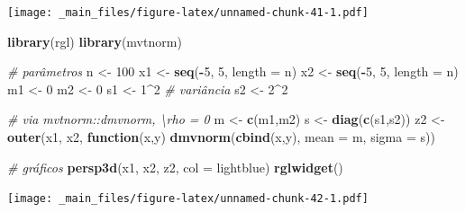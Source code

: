 \documentclass[
]{book}
\newenvironment{Shaded}{\begin{snugshade}}{\end{snugshade}}
\newcommand{\CommentTok}[1]{\textcolor[rgb]{0.56,0.35,0.01}{\textit{#1}}}
\newcommand{\ControlFlowTok}[1]{\textcolor[rgb]{0.13,0.29,0.53}{\textbf{#1}}}
\newcommand{\DataTypeTok}[1]{\textcolor[rgb]{0.13,0.29,0.53}{#1}}
\newcommand{\DecValTok}[1]{\textcolor[rgb]{0.00,0.00,0.81}{#1}}
\newcommand{\KeywordTok}[1]{\textcolor[rgb]{0.13,0.29,0.53}{\textbf{#1}}}
\newcommand{\NormalTok}[1]{#1}
\newcommand{\OperatorTok}[1]{\textcolor[rgb]{0.81,0.36,0.00}{\textbf{#1}}}
\newcommand{\StringTok}[1]{\textcolor[rgb]{0.31,0.60,0.02}{#1}}
\theoremstyle{definition}
\theoremstyle{definition}
\theoremstyle{definition}
\theoremstyle{remark}
\begin{document}
\texttt{[image: \_main\_files/figure-latex/unnamed-chunk-41-1.pdf]}

\begin{Shaded}
\begin{Highlighting}[]
\KeywordTok{library}\NormalTok{(rgl)}
\KeywordTok{library}\NormalTok{(mvtnorm)}

\CommentTok{\# parâmetros}
\NormalTok{n \textless{}{-}}\StringTok{ }\DecValTok{100}
\NormalTok{x1 \textless{}{-}}\StringTok{ }\KeywordTok{seq}\NormalTok{(}\OperatorTok{{-}}\DecValTok{5}\NormalTok{, }\DecValTok{5}\NormalTok{, }\DataTypeTok{length =}\NormalTok{ n)}
\NormalTok{x2 \textless{}{-}}\StringTok{ }\KeywordTok{seq}\NormalTok{(}\OperatorTok{{-}}\DecValTok{5}\NormalTok{, }\DecValTok{5}\NormalTok{, }\DataTypeTok{length =}\NormalTok{ n)}
\NormalTok{m1 \textless{}{-}}\StringTok{ }\DecValTok{0}
\NormalTok{m2 \textless{}{-}}\StringTok{ }\DecValTok{0}
\NormalTok{s1 \textless{}{-}}\StringTok{ }\DecValTok{1}\OperatorTok{\^{}}\DecValTok{2}  \CommentTok{\# variância}
\NormalTok{s2 \textless{}{-}}\StringTok{ }\DecValTok{2}\OperatorTok{\^{}}\DecValTok{2}

\CommentTok{\# via mvtnorm::dmvnorm, \textbackslash{}rho = 0}
\NormalTok{m \textless{}{-}}\StringTok{ }\KeywordTok{c}\NormalTok{(m1,m2)}
\NormalTok{s \textless{}{-}}\StringTok{ }\KeywordTok{diag}\NormalTok{(}\KeywordTok{c}\NormalTok{(s1,s2))}
\NormalTok{z2 \textless{}{-}}\StringTok{ }\KeywordTok{outer}\NormalTok{(x1, x2, }\ControlFlowTok{function}\NormalTok{(x,y) }\KeywordTok{dmvnorm}\NormalTok{(}\KeywordTok{cbind}\NormalTok{(x,y), }\DataTypeTok{mean =}\NormalTok{ m, }\DataTypeTok{sigma =}\NormalTok{ s))}

\CommentTok{\# gráficos}
\KeywordTok{persp3d}\NormalTok{(x1, x2, z2, }\DataTypeTok{col =} \StringTok{\textquotesingle{}lightblue\textquotesingle{}}\NormalTok{)}
\KeywordTok{rglwidget}\NormalTok{()}
\end{Highlighting}
\end{Shaded}

\texttt{[image: \_main\_files/figure-latex/unnamed-chunk-42-1.pdf]}
\end{document}
